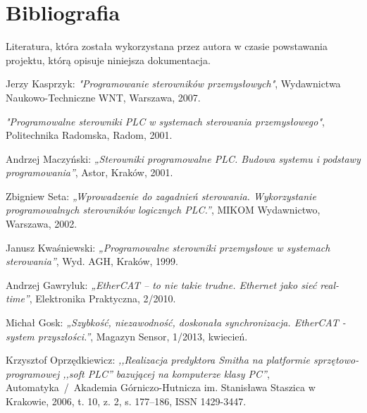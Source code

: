 \section{Bibliografia}
Literatura, która została wykorzystana przez autora w czasie powstawania projektu, którą opisuje niniejsza dokumentacja.

\begin{thebibliography}{99}
Jerzy Kasprzyk: 
\emph{"Programowanie sterowników przemysłowych"},
Wydawnictwa Naukowo-Techniczne WNT, 
Warszawa, 
2007.      

\emph{"Programowalne sterowniki PLC w systemach sterowania przemysłowego"}, 
Politechnika Radomska, 
Radom,
2001.

Andrzej Maczyński:
\emph{„Sterowniki programowalne PLC. Budowa systemu i podstawy programowania”},
Astor, 
Kraków,
2001. 

Zbigniew Seta: 
\emph{„Wprowadzenie do zagadnień sterowania. Wykorzystanie programowalnych sterowników logicznych PLC.”},
MIKOM Wydawnictwo, 
Warszawa,
2002. 

Janusz Kwaśniewski: 
\emph{„Programowalne sterowniki przemysłowe w systemach sterowania”}, 
Wyd. AGH, 
Kraków,
1999.

%
%
%

Andrzej Gawryluk:
\emph{„EtherCAT – to nie takie trudne. Ethernet jako sieć real-time”},
Elektronika Praktyczna, 2/2010.

Michał Gosk:
\emph{„Szybkość, niezawodność, doskonała synchronizacja. EtherCAT - system przyszłości.”},
Magazyn Sensor, 1/2013, kwiecień.

Krzysztof Oprzędkiewicz:
\emph{,,Realizacja predyktora Smitha na platformie sprzętowo-programowej ,,soft PLC'' bazującej na komputerze klasy PC''},
Automatyka~/~Akademia Górniczo-Hutnicza im. Stanisława Staszica w Krakowie,
2006,
t. 10, z. 2, s. 177--186,
ISSN 1429-3447.
\end{thebibliography}

